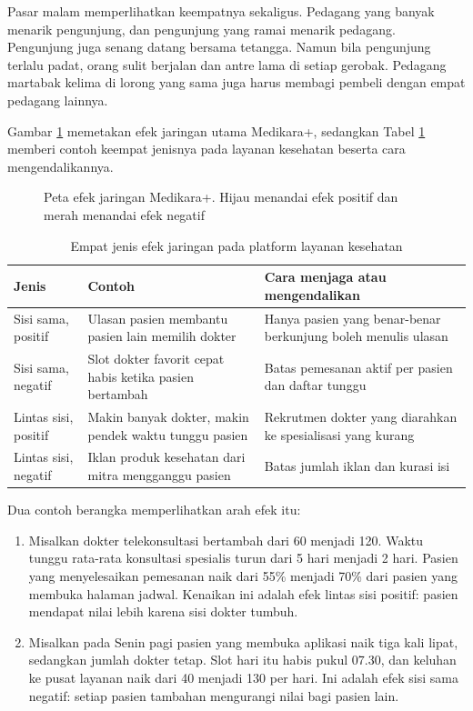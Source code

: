 Pasar malam memperlihatkan keempatnya sekaligus. Pedagang yang banyak menarik
pengunjung, dan pengunjung yang ramai menarik pedagang. Pengunjung juga senang
datang bersama tetangga. Namun bila pengunjung terlalu padat, orang sulit
berjalan dan antre lama di setiap gerobak. Pedagang martabak kelima di lorong
yang sama juga harus membagi pembeli dengan empat pedagang lainnya.

Gambar \ref{fig:ch02-efek-jaringan} memetakan efek jaringan utama Medikara+,
sedangkan Tabel \ref{tab:ch02-jenis-efek} memberi contoh keempat jenisnya pada
layanan kesehatan beserta cara mengendalikannya.

\begin{figure}[!htb]
  \centering
  
  \caption{Peta efek jaringan Medikara+. Hijau menandai efek positif dan merah
           menandai efek negatif}
  \label{fig:ch02-efek-jaringan}
\end{figure}

\begin{table}[!htb]
  \centering
  \caption{Empat jenis efek jaringan pada platform layanan kesehatan}
  \label{tab:ch02-jenis-efek}
  \begin{tabularx}{\textwidth}{lXX}
    \hline
    \textbf{Jenis} & \textbf{Contoh} & \textbf{Cara menjaga atau mengendalikan} \\
    \hline
    Sisi sama, positif & Ulasan pasien membantu pasien lain memilih dokter & Hanya pasien yang benar-benar berkunjung boleh menulis ulasan \\
    \hline
    Sisi sama, negatif & Slot dokter favorit cepat habis ketika pasien bertambah & Batas pemesanan aktif per pasien dan daftar tunggu \\
    \hline
    Lintas sisi, positif & Makin banyak dokter, makin pendek waktu tunggu pasien & Rekrutmen dokter yang diarahkan ke spesialisasi yang kurang \\
    \hline
    Lintas sisi, negatif & Iklan produk kesehatan dari mitra mengganggu pasien & Batas jumlah iklan dan kurasi isi \\
    \hline
  \end{tabularx}
\end{table}

Dua contoh berangka memperlihatkan arah efek itu:
\begin{enumerate}
  \item Misalkan dokter telekonsultasi bertambah dari 60 menjadi 120. Waktu
        tunggu rata-rata konsultasi spesialis turun dari 5 hari menjadi 2
        hari. Pasien yang menyelesaikan pemesanan naik dari 55\% menjadi 70\%
        dari pasien yang membuka halaman jadwal. Kenaikan ini adalah efek
        lintas sisi positif: pasien mendapat nilai lebih karena sisi dokter
        tumbuh.
  \item Misalkan pada Senin pagi pasien yang membuka aplikasi naik tiga kali
        lipat, sedangkan jumlah dokter tetap. Slot hari itu habis pukul 07.30,
        dan keluhan ke pusat layanan naik dari 40 menjadi 130 per hari. Ini
        adalah efek sisi sama negatif: setiap pasien tambahan mengurangi nilai
        bagi pasien lain.
\end{enumerate}

